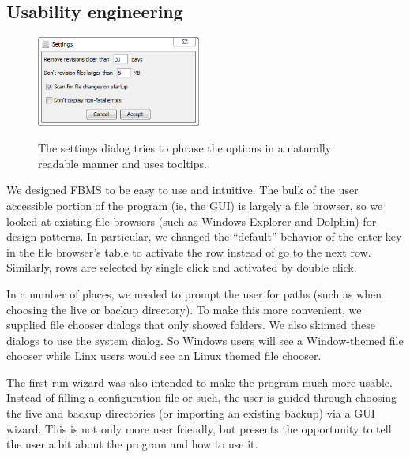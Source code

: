 \documentclass[12pt,a4paper]{article}
\begin{document}
\subsection{Usability engineering}
\begin{figure}
\vspace{-20pt}
\begin{center}
\includegraphics[width=0.48\textwidth]{images/settings.png}
\end{center}
\footnotesize{The settings dialog tries to phrase the options in a naturally readable manner and uses tooltips.}
\end{figure}

We designed FBMS to be easy to use and intuitive. The bulk of the user accessible portion of the program (ie, the GUI) is largely a file browser, so we looked at existing file browsers (such as Windows Explorer\cite{explorer} and Dolphin\cite{dolphin}) for design patterns. In particular, we changed the ``default'' behavior of the enter key in the file browser's table to activate the row instead of go to the next row. Similarly, rows are selected by single click and activated by double click.

In a number of places, we needed to prompt the user for paths (such as when choosing the live or backup directory). To make this more convenient, we supplied file chooser dialogs that only showed folders. We also skinned these dialogs to use the system dialog. So Windows users will see a Window-themed file chooser while Linx users would see an Linux themed file chooser.

The first run wizard was also intended to make the program much more usable. Instead of filling a configuration file or such, the user is guided through choosing the live and backup directories (or importing an existing backup) via a GUI wizard. This is not only more user friendly, but presents the opportunity to tell the user a bit about the program and how to use it.
\end{document}
